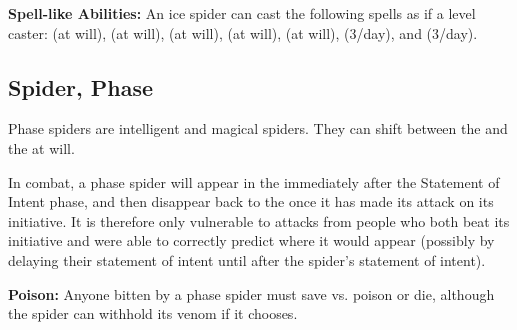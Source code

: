 \begin{multicols*}{2}
\textbf{Spell-like Abilities:} An ice spider can cast the following spells as if a  level caster:  (at will),  (at will),  (at will),  (at will),  (at will),  (3/day), and  (3/day).

\subsection{Spider, Phase}

Phase spiders are intelligent and magical spiders. They can shift between the  and the  at will.

In combat, a phase spider will appear in the  immediately after the Statement of Intent phase, and then disappear back to the  once it has made its attack on its initiative. It is therefore only vulnerable to attacks from people who both beat its initiative and were able to correctly predict where it would appear (possibly by delaying their statement of intent until after the spider’s statement of intent).

\textbf{Poison:} Anyone bitten by a phase spider must save vs. poison or die, although the spider can withhold its venom if it chooses.


\end{multicols*}
